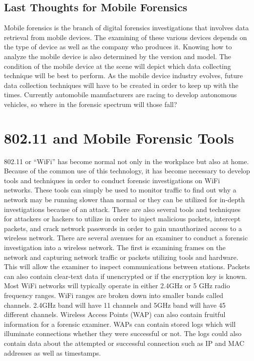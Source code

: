 \documentclass[acmlarge]{acmart}
\begin{document}
\subsection{Last Thoughts for Mobile Forensics}
	Mobile forensics is the branch of digital forensics investigations that involves data retrieval from mobile devices.  The examining of these various devices depends on the type of device as well as the company who produces it.  Knowing how to analyze the mobile device is also determined by the version and model.  The condition of the mobile device at the scene will depict which data collecting technique will be best to perform.  As the mobile device industry evolves, future data collection techniques will have to be created in order to keep up with the times.  Currently automobile manufacturers are racing to develop autonomous vehicles, so where in the forensic spectrum will those fall?

\section{802.11 and Mobile Forensic Tools}

802.11 or “WiFi” has become normal not only in the workplace but also at home. Because of the common use of this technology, it has become necessary to develop tools and techniques in order to conduct forensic investigations on WiFi networks. These tools can simply be used to monitor traffic to find out why a network may be running slower than normal or they can be utilized for in-depth investigations because of an attack. There are also several tools and techniques for attackers or hackers to utilize in order to inject malicious packets, intercept packets, and crack network passwords in order to gain unauthorized access to a wireless network. 
There are several avenues for an examiner to conduct a forensic investigation into a wireless network. The first is examining frames on the network and capturing network traffic or packets utilizing tools and hardware. This will allow the examiner to inspect communications between stations. Packets can also contain clear-text data if unencrypted or if the encryption key is known. Most WiFi networks will typically operate in either 2.4GHz or 5 GHz radio frequency ranges. WiFi ranges are broken down into smaller bands called channels. 2.4GHz band will have 11 channels and 5GHz band will have 45 different channels. 
Wireless Access Points (WAP) can also contain fruitful information for a forensic examiner. WAPs can contain stored logs which will illuminate connections whether they were successful or not. The logs could also contain data about the attempted or successful connection such as IP and MAC addresses as well as timestamps. 
\end{document}
